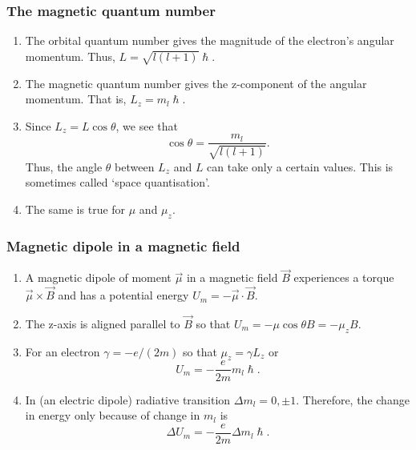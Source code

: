 \documentclass{beamer}
\begin{document}
\begin{frame}
\frametitle{The magnetic quantum number}
\begin{enumerate}
\item The orbital quantum number gives the magnitude of the electron's angular
momentum. Thus, $L = \sqrt{l(l + 1)}\hslash$.
\item The magnetic quantum number gives the z-component of the angular momentum.
That is, $L_z = m_l\hslash$. 
\item Since $L_z = L\cos\theta$, we see that
\begin{equation}\label{e10}
\cos\theta = \frac{m_l}{\sqrt{l(l + 1)}}.
\end{equation}
Thus, the angle $\theta$ between $L_z$ and $L$ can take only a certain values. 
This is sometimes called `space quantisation'.
\item The same is true for $\mu$ and $\mu_z$.
\end{enumerate}
\end{frame}

\begin{frame}
\frametitle{Magnetic dipole in a magnetic field}
\begin{enumerate}
\item A magnetic dipole of moment $\vec{\mu}$ in a magnetic field $\vec{B}$ 
experiences a torque $\vec{\mu} \times \vec{B}$ and has a potential energy
$U_m = -\vec{\mu}\cdot\vec{B}$.
\item The z-axis is aligned parallel to $\vec{B}$ so that $U_m=-\mu\cos\theta B
= -\mu_z B$.
\item For an electron $\gamma = -e/(2m)$ so that $\mu_z = \gamma L_z$ or
\begin{equation}\label{e11}
U_m = -\frac{e}{2m}m_l\hslash.
\end{equation}
\item In (an electric dipole) radiative transition $\Delta m_l = 0, \pm 1$.
Therefore, the change in energy only because of change in $m_l$ is
\begin{equation}\label{e12}
\Delta U_m = -\frac{e}{2m}\Delta m_l\hslash.
\end{equation}
\end{enumerate}
\end{frame}
\end{document}

